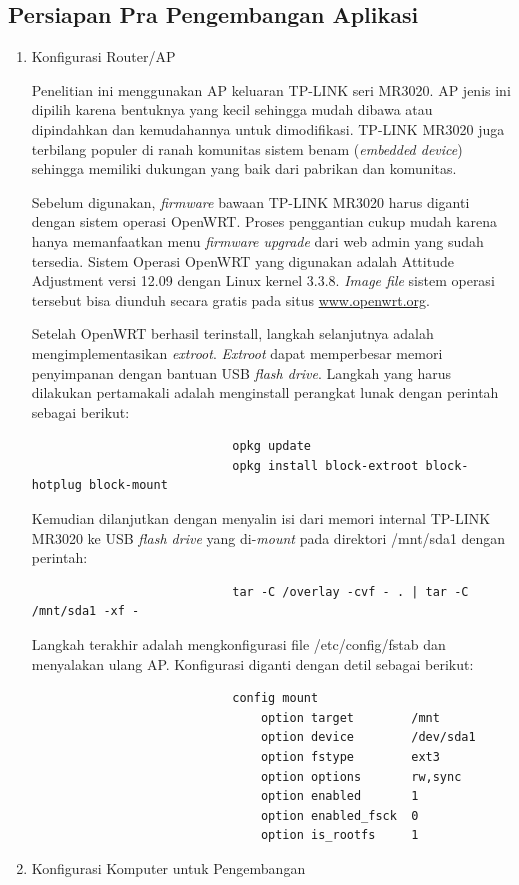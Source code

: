 		\subsection{Persiapan Pra Pengembangan Aplikasi}
			\begin{enumerate}
				\item Konfigurasi Router/AP

					Penelitian ini menggunakan AP keluaran TP-LINK seri MR3020. AP jenis ini dipilih karena bentuknya yang kecil sehingga mudah dibawa atau dipindahkan dan kemudahannya untuk dimodifikasi. TP-LINK MR3020 juga terbilang populer di ranah komunitas sistem benam (\emph{embedded device}) sehingga memiliki dukungan yang baik dari pabrikan dan komunitas. 

					Sebelum digunakan, \emph{firmware} bawaan TP-LINK MR3020 harus diganti dengan sistem operasi OpenWRT. Proses penggantian cukup mudah karena hanya memanfaatkan menu \emph{firmware upgrade} dari web admin yang sudah tersedia.	Sistem Operasi OpenWRT yang digunakan adalah Attitude Adjustment versi 12.09 dengan Linux kernel 3.3.8. \emph{Image file} sistem operasi tersebut bisa diunduh secara gratis pada situs \url{www.openwrt.org}.

					Setelah OpenWRT berhasil terinstall, langkah selanjutnya adalah mengimplementasikan \emph{extroot}. \emph{Extroot} dapat memperbesar memori penyimpanan dengan bantuan USB \emph{flash drive}. Langkah yang harus dilakukan pertamakali adalah menginstall perangkat lunak dengan perintah sebagai berikut:
					\begingroup
					    \fontsize{10pt}{12pt}\selectfont
					    \begin{verbatim}
							opkg update
							opkg install block-extroot block-hotplug block-mount
					    \end{verbatim}  
					\endgroup

					Kemudian dilanjutkan dengan menyalin isi dari memori internal TP-LINK MR3020 ke USB \emph{flash drive} yang di-\emph{mount} pada direktori /mnt/sda1 dengan perintah:
					\begingroup
					    \fontsize{10pt}{12pt}\selectfont
					    \begin{verbatim}
							tar -C /overlay -cvf - . | tar -C /mnt/sda1 -xf -
					    \end{verbatim}  
					\endgroup

					Langkah terakhir adalah mengkonfigurasi file /etc/config/fstab dan menyalakan ulang AP. Konfigurasi diganti dengan detil sebagai berikut:
					\begingroup
					    \fontsize{10pt}{12pt}\selectfont
					    \begin{verbatim}
							config mount
						        option target        /mnt
						        option device        /dev/sda1
						        option fstype        ext3
						        option options       rw,sync
						        option enabled       1
						        option enabled_fsck  0
						        option is_rootfs     1
					    \end{verbatim}  
					\endgroup

				\item Konfigurasi Komputer untuk Pengembangan
			\end{enumerate}
